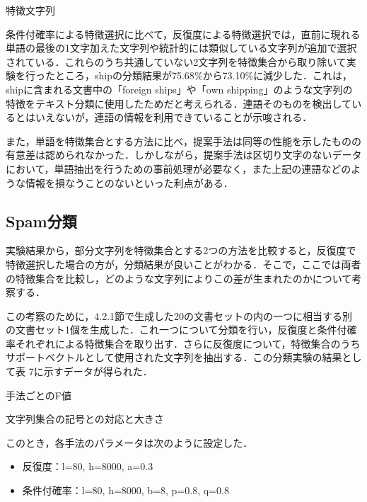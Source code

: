 \documentclass[japanese]{jnlp_1.4}
\begin{document}
\begin{table}[b]
\caption{特徴文字列}

\end{table}

条件付確率による特徴選択に比べて，反復度による特徴選択では，直前に現れる単語の最後の1文字加えた文字列や統計的には類似している文字列が追加で選択されている．これらのうち共通していない2文字列を特徴集合から取り除いて実験を行ったところ，shipの分類結果が75.68{\%}から73.10{\%}に減少した．これは，shipに含まれる文書中の「foreign 
ships」や「own 
shipping」のような文字列の特徴をテキスト分類に使用したためだと考えられる．連語そのものを検出しているとはいえないが，連語の情報を利用できていることが示唆される．

また，単語を特徴集合とする方法に比べ，提案手法は同等の性能を示したものの有意差は認められなかった．しかしながら，提案手法は区切り文字のないデータにおいて，単語抽出を行うための事前処理が必要なく，また上記の連語などのような情報を損なうことのないといった利点がある．


\subsection{Spam分類}

実験結果から，部分文字列を特徴集合とする2つの方法を比較すると，反復度で特徴選択した場合の方が，分類結果が良いことがわかる．そこで，ここでは両者の特徴集合を比較し，どのような文字列によりこの差が生まれたのかについて考察する．

この考察のために，4.2.1節で生成した20の文書セットの内の一つに相当する別の文書セット1個を生成した．これ一つについて分類を行い，反復度と条件付確率それぞれによる特徴集合を取り出す．さらに反復度について，特徴集合のうちサポートベクトルとして使用された文字列を抽出する．この分類実験の結果として表 
7に示すデータが得られた．


\begin{table}[b]
\begin{minipage}[t]{105pt}
\caption{手法ごとのF値}

\end{minipage}
\hfill
\begin{minipage}[t]{280pt}
\caption{文字列集合の記号との対応と大きさ}

\end{minipage}
\end{table}

このとき，各手法のパラメータは次のように設定した．

\begin{itemize}
\item 反復度：l=80, h=8000, a=0.3
\item 条件付確率：l=80, h=8000, b=8, p=0.8, q=0.8
\end{itemize}
\end{document}
